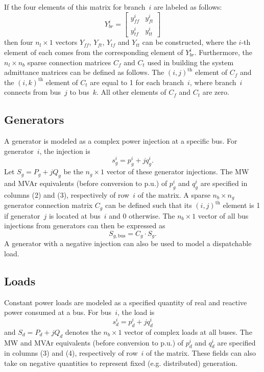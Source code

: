 \documentclass[12pt]{article}
\newcommand{\code}[1]{{\relsize{-0.5}{\tt{{#1}}}}}  %
\newcommand{\bus}[0]{\code{bus}}
\newcommand{\gen}[0]{\code{gen}}
\numberwithin{equation}{section}
\numberwithin{table}{section}
\numberwithin{figure}{section}
\begin{document}
If the four elements of this matrix for branch~$i$ are labeled as follows:
\begin{equation}
Y_{br}^i = \left[\begin{array}{cc}
y_{f\!f}^i & y_{ft}^i \\
y_{t\!f}^i & y_{tt}^i
\end{array}\right]
\label{eq:Ybri}
\end{equation}
then four $n_l \times 1$ vectors $Y_{f\!f}$, $Y_{ft}$, $Y_{t\!f}$ and $Y_{tt}$ can be constructed, where the $i$-th element of each comes from the corresponding element of $Y_{br}^i$. Furthermore, the $n_l \times n_b$ sparse connection matrices $C_f$ and $C_t$ used in building the system admittance matrices can be defined as follows. The $(i,j)^\mathrm{th}$ element of $C_f$ and the $(i,k)^\mathrm{th}$ element of $C_t$ are equal to 1 for each branch~$i$, where branch~$i$ connects from bus~$j$ to bus~$k$. All other elements of $C_f$ and $C_t$ are zero.


\subsection{Generators}

A generator is modeled as a complex power injection at a specific bus. For generator~$i$, the injection is
\begin{equation}
s^i_g = p^i_g + j q^i_g.
\end{equation}
Let $S_g = P_g + j Q_g$ be the $n_g \times 1$ vector of these generator injections. The MW and MVAr equivalents (before conversion to p.u.) of $p^i_g$ and $q^i_g$ are specified in columns \code{PG} (2) and \code{QG} (3), respectively of row~$i$ of the \gen{} matrix. A sparse $n_b \times n_g$ generator connection matrix $C_g$ can be defined such that its $(i,j)^\mathrm{th}$ element is 1 if generator~$j$ is located at bus~$i$ and 0 otherwise. The $n_b \times 1$ vector of all bus injections from generators can then be expressed as
\begin{equation}
S_{g,\mathrm{bus}} = C_g \cdot S_g.
\end{equation}
A generator with a negative injection can also be used to model a dispatchable load.

\subsection{Loads}

Constant power loads are modeled as a specified quantity of real and reactive power consumed at a bus. For bus~$i$, the load is
\begin{equation}
s^i_d = p^i_d + j q^i_d
\end{equation}
and $S_d = P_d + j Q_d$ denotes the $n_b \times 1$ vector of complex loads at all buses. The MW and MVAr equivalents (before conversion to p.u.) of $p^i_d$ and $q^i_d$ are specified in columns \code{PD} (3) and \code{QD} (4), respectively of row~$i$ of the \bus{} matrix. These fields can also take on negative quantities to represent fixed (e.g. distributed) generation.
\end{document}
